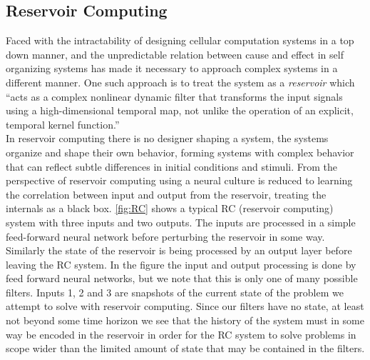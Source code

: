 \subsection{Reservoir Computing}
Faced with the intractability of designing cellular computation systems in a top
down manner, and the unpredictable relation between cause and effect in self organizing
systems has made it necessary to approach complex systems in a different manner.
One such approach is to treat the system as a \textit{reservoir}
\cite{schrauwen_overview_2007} which
``acts as a complex nonlinear dynamic filter that transforms the
input signals using a high-dimensional temporal map, not unlike the operation
of an explicit, temporal kernel function.''\\
In reservoir computing there is no designer shaping a system, the systems
organize and shape their own behavior, forming systems with complex behavior
that can reflect subtle differences in initial conditions and stimuli.
From the perspective of reservoir computing using a neural culture is reduced to
learning the correlation between input and output from the reservoir, treating
the internals as a black box.
\ref{fig:RC} shows a typical RC (reservoir computing) system with three inputs
and two outputs. The inputs are processed in a simple feed-forward neural
network before perturbing the reservoir in some way.
Similarly the state of the reservoir is being processed by an output layer
before leaving the RC system.
In the figure the input and output processing is done by feed forward neural
networks, but we note that this is only one of many possible filters.
Inputs 1, 2 and 3 are snapshots of the current state of the problem we attempt
to solve with reservoir computing.
Since our filters have no state, at least not beyond some time horizon we see
that the history of the system must in some way be encoded in the reservoir in
order for the RC system to solve problems in scope wider than the limited amount
of state that may be contained in the filters.
\begin{figure*}[h]
  
  \caption{A reservoir comput-thingy}
  \label{fig:RC}
\end{figure*}
